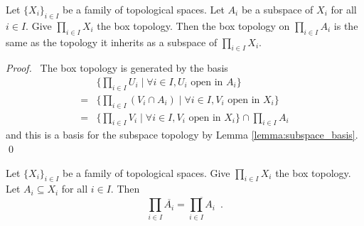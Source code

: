 \begin{theorem}
    Let $\{ X_i \}_{i \in I}$ be a family of topological spaces. Let $A_i$ be a subspace of $X_i$ for all $i \in I$.
    Give $\prod_{i \in I} X_i$ the box topology.
    Then the box topology on $\prod_{i \in I} A_i$ is the same as the topology it inherits as a subspace of
    $\prod_{i \in I} X_i$.
\end{theorem}

\begin{proof}
    \pf\ The box topology is generated by the basis
    \begin{align*}
        & \{ \prod_{i \in I} U_i \mid \forall i \in I, U_i \text{ open in } A_i \} \\
        = & \{ \prod_{i \in I} (V_i \cap A_i) \mid \forall i \in I, V_i \text{ open in } X_i \} \\
        = & \{ \prod_{i \in I} V_i \mid \forall i \in I, V_i \text{ open in } X_i \} \cap \prod_{i \in I} A_i
    \end{align*}
    and this is a basis for the subspace topology by Lemma \ref{lemma:subspace_basis}. \qed
\end{proof}

\begin{proposition}[AC]
    Let $\{ X_i \}_{i \in I}$ be a family of topological spaces. Give $\prod_{i \in I} X_i$ the box topology.
    Let $A_i \subseteq X_i$ for all $i \in I$.
    Then
    \[ \prod_{i \in I} \overline{A_i} = \overline{\prod_{i \in I} A_i} \enspace . \]
\end{proposition}

